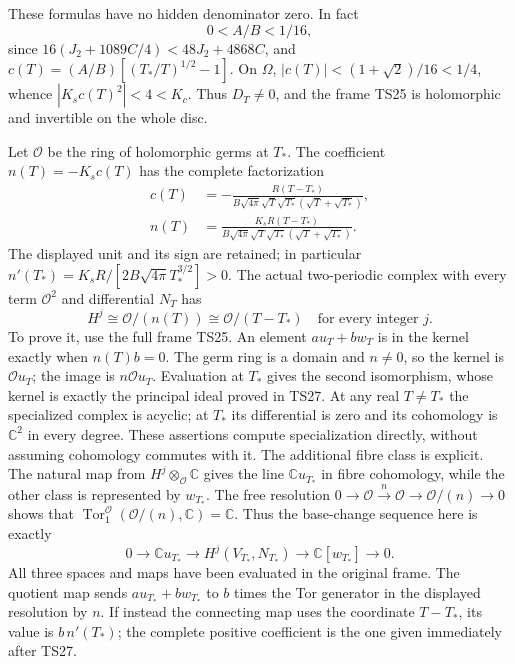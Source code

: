 These formulas have no hidden denominator zero. In fact
\[
 0<A/B<1/16,
\]
since \(16(J_2+1089C/4)<48J_2+4868C\), and
\(c(T)=(A/B)[(T_*/T)^{1/2}-1]\). On \(\Omega\),
\(|c(T)|<(1+\sqrt2)/16<1/4\), whence
\(|K_sc(T)^2|<4<K_c\). Thus \(D_T\ne0\), and the
frame TS25 is holomorphic and invertible on the whole disc.

Let \(\mathcal O\) be the ring of holomorphic germs at \(T_*\).
The coefficient \(n(T)=-K_sc(T)\) has the complete factorization
\[
\begin{split}
 c(T)&=-\frac{R(T-T_*)}
 {B\sqrt{4\pi}\sqrt T\sqrt{T_*}(\sqrt T+\sqrt{T_*})},\\
 n(T)&=\frac{K_sR(T-T_*)}
 {B\sqrt{4\pi}\sqrt T\sqrt{T_*}(\sqrt T+\sqrt{T_*})}.
\end{split}\tag{TS27}
\]
The displayed unit and its sign are retained; in particular
\(n'(T_*)=K_sR/[2B\sqrt{4\pi}T_*^{3/2}]>0\).
The actual two-periodic complex with every term \(\mathcal O^2\)
and differential \(N_T\) has
\[
 H^j\cong\mathcal O/(n(T))\cong\mathcal O/(T-T_*)
 \quad\text{for every integer }j.\tag{TS28}
\]
To prove it, use the full frame TS25. An element \(a u_T+b w_T\)
is in the kernel exactly when \(n(T)b=0\). The germ ring is a
domain and \(n\ne0\), so the kernel is \(\mathcal O u_T\);
the image is \(n\mathcal O u_T\). Evaluation at \(T_*\)
gives the second isomorphism, whose kernel is exactly the principal
ideal proved in TS27. At any real \(T\ne T_*\) the specialized
complex is acyclic; at \(T_*\) its differential is zero and its
cohomology is \(\mathbb C^2\) in every degree. These assertions
compute specialization directly, without assuming cohomology
commutes with it.
The additional fibre class is explicit. The natural map from
\(H^j\otimes_{\mathcal O}\mathbb C\) gives the line
\(\mathbb C u_{T_*}\) in fibre cohomology, while the other
class is represented by \(w_{T_*}\). The free resolution
\(0\to\mathcal O\xrightarrow{n}\mathcal O\to
\mathcal O/(n)\to0\) shows that
\(\operatorname{Tor}_1^{\mathcal O}(\mathcal O/(n),\mathbb C)
=\mathbb C\). Thus the base-change sequence here is exactly
\[
 0\longrightarrow\mathbb C u_{T_*}
 \longrightarrow H^j(V_{T_*},N_{T_*})
 \longrightarrow\mathbb C[w_{T_*}]\longrightarrow0.
 \tag{TS28a}
\]
All three spaces and maps have been evaluated in the original frame.
The quotient map sends \(a u_{T_*}+b w_{T_*}\) to \(b\)
times the Tor generator in the displayed resolution by \(n\).
If instead the connecting map uses the coordinate \(T-T_*\),
its value is \(b\,n'(T_*)\); the complete positive coefficient
is the one given immediately after TS27.

